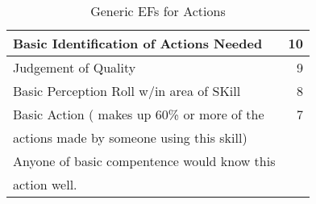 \begin{table}[h]
\centering
\caption{Generic EFs for Actions}
	\begin{tabular}{lr}	\hline
	Basic Identification of Actions Needed		  & 10	\\ \hline
	Judgement of Quality                          & 9	\\ \hline
	Basic Perception Roll w/in area of SKill      & 8	\\ \hline
	Basic Action ( makes up 60\% or more of the   & 7	\\  
	actions made by someone using this skill)     &      \\
	Anyone of basic compentence would know this   &      \\
	action well.                                  &      \\ \hline 
	\end{tabular}
\end{table}
